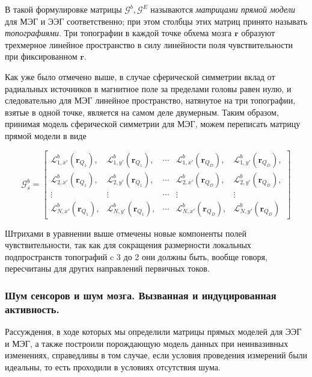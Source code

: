 В такой формулировке матрицы $\mathcal{G}^b, \mathcal{G}^E$ называются \emph{матрицами прямой модели} для МЭГ и ЭЭГ соответственно;
при этом столбцы этих матриц принято называть \emph{топографиями}. Три топографии в каждой точке обхема мозга $\mathbf{r}$
образуют трехмерное линейное пространство в силу линейности поля чувствительности при фиксированном $\mathbf{r}$.

Как уже было отмечено выше, в случае сферической симметрии вклад от радиальных источников в магнитное поле за пределами головы
равен нулю, и следовательно для МЭГ линейное пространство, натянутое на три топографии, взятые в одной точке, является
на самом деле двумерным. Таким образом, принимая модель сферической симметрии для МЭГ, можем переписать матрицу прямой модели в виде

\begin{equation}
    \mathcal{G}^b_{s} =
    \begin{bmatrix}
        \mathcal{L}_{1,x'}^b(\mathbf{r}_{Q_1}), & \mathcal{L}_{1,y'}^b(\mathbf{r}_{Q_1}), &
        \cdots &
        \mathcal{L}_{1,x'}^b(\mathbf{r}_{Q_D}), & \mathcal{L}_{1,y'}^b(\mathbf{r}_{Q_D}), \\
        \mathcal{L}_{2,x'}^b(\mathbf{r}_{Q_1}), & \mathcal{L}_{2,y'}^b(\mathbf{r}_{Q_1}), &
        \cdots &
        \mathcal{L}_{2,x'}^b(\mathbf{r}_{Q_D}), & \mathcal{L}_{2,y'}^b(\mathbf{r}_{Q_D}), \\
        \vdots                                    & \vdots                                    &
        \cdots &
        \vdots                                    & \vdots                                    \\
        \mathcal{L}_{N,x'}^b(\mathbf{r}_{Q_1}), & \mathcal{L}_{N,y'}^b(\mathbf{r}_{Q_1}), &
        \cdots &
        \mathcal{L}_{N,x'}^b(\mathbf{r}_{Q_D}), & \mathcal{L}_{N,y'}^b(\mathbf{r}_{Q_D})
    \end{bmatrix}
\end{equation}

Штрихами в уравнении выше отмечены новые компоненты полей чувствительности, так как для сокращения размерности
локальных подпространств топографий c 3 до 2 они должны быть, вообще говоря,
пересчитаны для других направлений первичных токов.

\subsubsection{Шум сенсоров и шум мозга. Вызванная и индуцированная активность.}
Рассуждения, в ходе которых мы определили матрицы прямых моделей для ЭЭГ и МЭГ, а также
построили порождающую модель данных при неинвазивных изменениях, справедливы в том случае, если
условия проведения измерений были идеальны, то есть проходили в условиях отсутствия шума.

